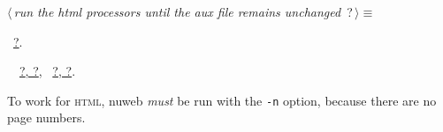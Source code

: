 \documentclass[twoside]{artikel3}
\renewcommand{\NWlink}[2]{\hyperlink{#1}{#2}}
\renewcommand{\NWtarget}[2]{\hypertarget{#1}{#2}}
\renewcommand{\NWsep}{$\diamond$\rule[-1\baselineskip]{0pt}{1\baselineskip}}
\renewcommand{\NWlink}[2]{\hyperlink{#1}{#2}}
\renewcommand{\NWtarget}[2]{\hypertarget{#1}{#2}}
\begin{document}
\begin{flushleft} \small
\begin{minipage}{\linewidth}\label{scrap38}\raggedright\small
\NWtarget{nuweb?}{} $\langle\,${\itshape run the html processors until the aux file remains unchanged}\nobreak\ {\footnotesize {?}}$\,\rangle\equiv$
\vspace{-1ex}
\vspace{-1.5ex}
\footnotesize
\begin{list}{}{\setlength{\itemsep}{-\parsep}\setlength{\itemindent}{-\leftmargin}}
\item \NWtxtMacroRefIn\ \NWlink{nuweb?}{?}.
\item \NWtxtIdentsUsed\nobreak\  \verb@auxfil@\nobreak\ \NWlink{nuweb?}{?}\NWlink{nuweb?}{, ?}, \verb@oldaux@\nobreak\ \NWlink{nuweb?}{?}\NWlink{nuweb?}{, ?}.
\item{}
\end{list}
\end{minipage}\vspace{4ex}
\end{flushleft}
To work for \textsc{html}, nuweb \emph{must} be run with the \verb|-n|
option, because there are no page numbers.
\end{document}
